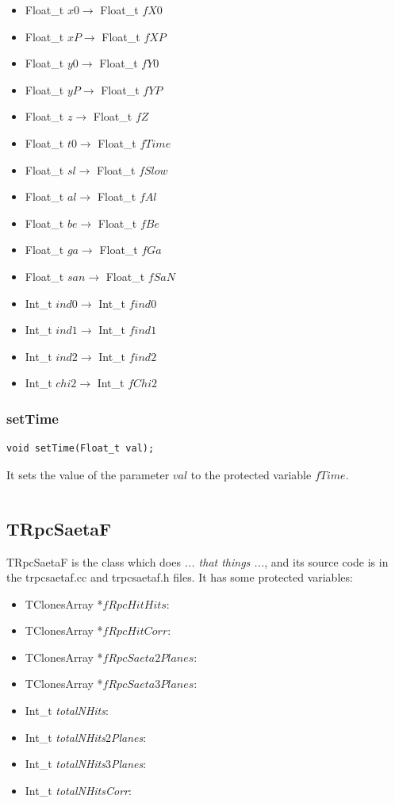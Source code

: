 \documentclass[a4paper]{book}
\begin{document}
\begin{itemize}
	\item Float\_t $x0 \rightarrow$ Float\_t $fX0$
	\item Float\_t $xP \rightarrow$ Float\_t $fXP$
	\item Float\_t $y0 \rightarrow$ Float\_t $fY0$
	\item Float\_t $yP \rightarrow$ Float\_t $fYP$
	\item Float\_t $z \rightarrow$ Float\_t $fZ$
	\item Float\_t $t0 \rightarrow$ Float\_t $fTime$
	\item Float\_t $sl \rightarrow$ Float\_t $fSlow$
	\item Float\_t $al \rightarrow$ Float\_t $fAl$
	\item Float\_t $be \rightarrow$ Float\_t $fBe$
	\item Float\_t $ga \rightarrow$ Float\_t $fGa$
	\item Float\_t $san \rightarrow$ Float\_t $fSaN$
	\item Int\_t $ind0 \rightarrow$ Int\_t $find0$
	\item Int\_t $ind1 \rightarrow$ Int\_t $find1$
	\item Int\_t $ind2 \rightarrow$ Int\_t $find2$
	\item Int\_t $chi2 \rightarrow$ Int\_t $fChi2$
\end{itemize}

\subsubsection{setTime}

\begin{lstlisting}[style=customc]
void setTime(Float_t val);
\end{lstlisting}

It sets the value of the parameter $val$ to the protected variable $fTime$.

\[\]




\subsection{TRpcSaetaF}

TRpcSaetaF is the class which does \textit{... that things ...}, and its source code is in the trpcsaetaf.cc and trpcsaetaf.h files. It has some protected variables:

\begin{itemize}
	\item TClonesArray  *$fRpcHitHits$: 
	\item TClonesArray  *$fRpcHitCorr$: 
	\item TClonesArray  *$fRpcSaeta2Planes$: 
	\item TClonesArray  *$fRpcSaeta3Planes$: 
	\item Int\_t \textit{totalNHits}: 
	\item Int\_t \textit{totalNHits}2\textit{Planes}: 
	\item Int\_t \textit{totalNHits}3\textit{Planes}: 
	\item Int\_t \textit{totalNHitsCorr}: 
\end{itemize}
\end{document}
